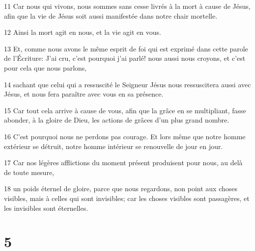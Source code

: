 \par 11 Car nous qui vivons, nous sommes sans cesse livrés à la mort à cause de Jésus, afin que la vie de Jésus soit aussi manifestée dans notre chair mortelle.
\par 12 Ainsi la mort agit en nous, et la vie agit en vous.
\par 13 Et, comme nous avons le même esprit de foi qui est exprimé dans cette parole de l'Écriture: J'ai cru, c'est pourquoi j'ai parlé! nous aussi nous croyons, et c'est pour cela que nous parlons,
\par 14 sachant que celui qui a ressuscité le Seigneur Jésus nous ressuscitera aussi avec Jésus, et nous fera paraître avec vous en sa présence.
\par 15 Car tout cela arrive à cause de vous, afin que la grâce en se multipliant, fasse abonder, à la gloire de Dieu, les actions de grâces d'un plus grand nombre.
\par 16 C'est pourquoi nous ne perdons pas courage. Et lors même que notre homme extérieur se détruit, notre homme intérieur se renouvelle de jour en jour.
\par 17 Car nos légères afflictions du moment présent produisent pour nous, au delà de toute mesure,
\par 18 un poids éternel de gloire, parce que nous regardons, non point aux choses visibles, mais à celles qui sont invisibles; car les choses visibles sont passagères, et les invisibles sont éternelles.

\chapter{5}

